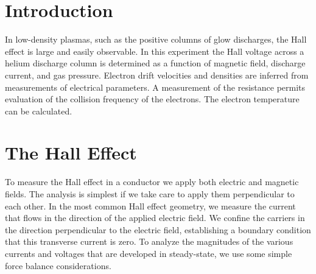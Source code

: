 \documentclass{../lab}
\begin{document}
\section{Introduction}

In low-density plasmas, such as the positive columns of glow discharges, the Hall effect is large and easily observable. In this experiment the Hall voltage across a helium discharge column is determined as a function of magnetic field, discharge current, and gas pressure. Electron drift velocities and densities are inferred from measurements of electrical parameters. A measurement of the resistance permits evaluation of the collision frequency of the electrons. The electron temperature can be calculated.

\section{The Hall Effect}

To measure the Hall effect in a conductor we apply both electric and magnetic fields. The analysis is simplest if we take care to apply them perpendicular to each other. In the most common Hall effect geometry, we measure the current that flows in the direction of the applied electric field. We confine the carriers in the direction perpendicular to the electric field, establishing a boundary condition that this transverse current is zero. To analyze the magnitudes of the various currents and voltages that are developed in steady-state, we use some simple force balance considerations.
\end{document}
